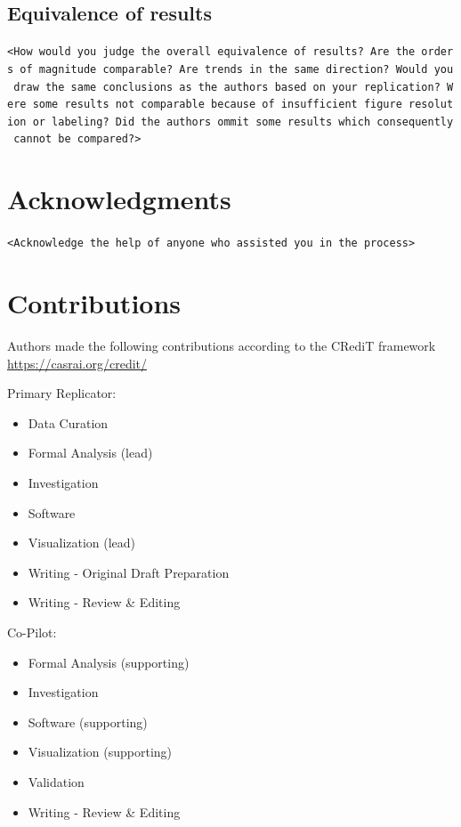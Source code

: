 \documentclass[10,a4paperpaper,]{article}
\begin{document}
\subsection{Equivalence of results}

\texttt{\textless{}How\ would\ you\ judge\ the\ overall\ equivalence\ of\ results?\ Are\ the\ orders\ of\ magnitude\ comparable?\ Are\ trends\ in\ the\ same\ direction?\ Would\ you\ draw\ the\ same\ conclusions\ as\ the\ authors\ based\ on\ your\ replication?\ Were\ some\ results\ not\ comparable\ because\ of\ insufficient\ figure\ resolution\ or\ labeling?\ Did\ the\ authors\ ommit\ some\ results\ which\ consequently\ cannot\ be\ compared?\textgreater{}}

\section{Acknowledgments}

\texttt{\textless{}Acknowledge\ the\ help\ of\ anyone\ who\ assisted\ you\ in\ the\ process\textgreater{}}

\section{Contributions}

Authors made the following contributions according to the CRediT
framework \url{https://casrai.org/credit/}

Primary Replicator:

\begin{itemize}
\tightlist
\item
  Data Curation\\
\item
  Formal Analysis (lead)\\
\item
  Investigation\\
\item
  Software\\
\item
  Visualization (lead)\\
\item
  Writing - Original Draft Preparation\\
\item
  Writing - Review \& Editing
\end{itemize}

Co-Pilot:

\begin{itemize}
\tightlist
\item
  Formal Analysis (supporting)\\
\item
  Investigation\\
\item
  Software (supporting)\\
\item
  Visualization (supporting)\\
\item
  Validation\\
\item
  Writing - Review \& Editing
\end{itemize}
\end{document}
